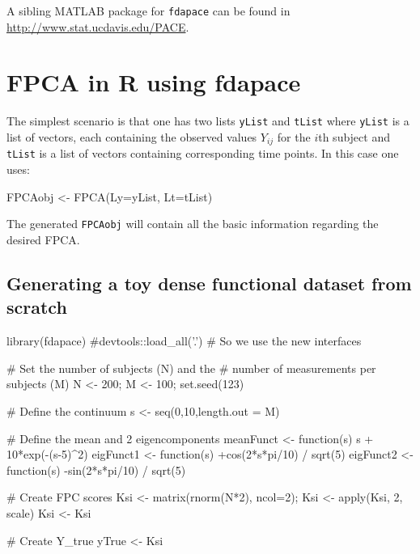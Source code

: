 \documentclass[11pt,english]{article}\usepackage[]{graphicx}\usepackage[]{color}
\begin{document}
A sibling MATLAB package for \texttt{fdapace} can be found in \url{http://www.stat.ucdavis.edu/PACE}.
\section{FPCA in R using fdapace}

The simplest scenario is that one has two lists \texttt{yList} and \texttt{tList} where \texttt{yList} is a list of vectors, each containing the observed values $Y_{ij}$ for the $i$th subject and \texttt{tList} is a list of vectors containing corresponding time points. In this case one uses: 

\begin{Schunk}
\begin{Sinput}
FPCAobj <- FPCA(Ly=yList, Lt=tList)
\end{Sinput}
\end{Schunk}
The generated \texttt{FPCAobj} will contain all the basic information regarding the desired FPCA.


\subsection{Generating a toy dense functional dataset from scratch}

\begin{Schunk}
\begin{Sinput}
  library(fdapace)
  #devtools::load_all('.') # So we use the new interfaces

  # Set the number of subjects (N) and the
  # number of measurements per subjects (M) 
  N <- 200;   
  M <- 100;
  set.seed(123)

  # Define the continuum
  s <- seq(0,10,length.out = M)
 
  # Define the mean and 2 eigencomponents
  meanFunct <- function(s) s + 10*exp(-(s-5)^2)
  eigFunct1 <- function(s) +cos(2*s*pi/10) / sqrt(5)
  eigFunct2 <- function(s) -sin(2*s*pi/10) / sqrt(5)
  
  # Create FPC scores
  Ksi <- matrix(rnorm(N*2), ncol=2);
  Ksi <- apply(Ksi, 2, scale)
  Ksi <- Ksi %*% diag(c(5,2))
 
  # Create Y_true
  yTrue <- Ksi %*% t(matrix(c(eigFunct1(s),eigFunct2(s)), ncol=2)) + t(matrix(rep(meanFunct(s),N), nrow=M))
\end{Sinput}
\end{Schunk}
\end{document}
